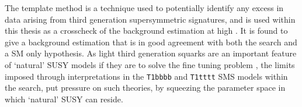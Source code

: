 The template method is a technique used to potentially identify any excess in data arising from third generation supersymmetric signatures, and is used within this thesis as a crosscheck of the \alphat background estimation at high \nbreco. It is found to give a background estimation that is in good agreement with both the \alphat search and a \ac{SM} only hypothesis. As light third generation squarks are an important feature of `natural' \ac{SUSY} models if they are to solve the fine tuning problem \cite{Hardy:2013ywa}, the limits imposed through interpretations in the \texttt{T1bbbb} and \texttt{T1tttt} \ac{SMS} models within the \alphat search, put pressure on such theories, by squeezing the parameter space in which `natural' \ac{SUSY} can reside. 

